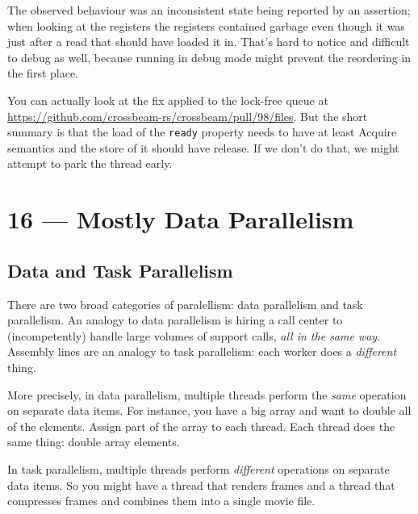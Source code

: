 \documentclass[a4paper]{report}
\begin{document}
The observed behaviour was an inconsistent state being reported by an assertion; when looking at the registers the registers contained garbage even though it was just after a read that should have loaded it in. That's hard to notice and difficult to debug as well, because running in debug mode might prevent the reordering in the first place.

You can actually look at the fix applied to the lock-free queue at \url{https://github.com/crossbeam-rs/crossbeam/pull/98/files}. But the short summary is that the load of the \texttt{ready} property needs to have at least Acquire semantics and the store of it should have release.  If we don't do that, we might attempt to park the thread early. 









\chapter*{16 --- Mostly Data Parallelism}



\section*{Data and Task Parallelism}
There are two broad categories of paralellism: data parallelism and
task parallelism. An analogy to data parallelism is hiring a call
center to (incompetently) handle large volumes of support calls,
\emph{all in the same way}. Assembly lines are an analogy to task
parallelism: each worker does a \emph{different} thing.

More precisely, in data parallelism, multiple threads perform the
\emph{same} operation on separate data items. For instance, you have a
big array and want to double all of the elements. Assign part of the
array to each thread. Each thread does the same thing: double array
elements.

In task parallelism, multiple threads perform \emph{different}
operations on separate data items. So you might have a thread that
renders frames and a thread that compresses frames and combines them
into a single movie file.

\end{document}
